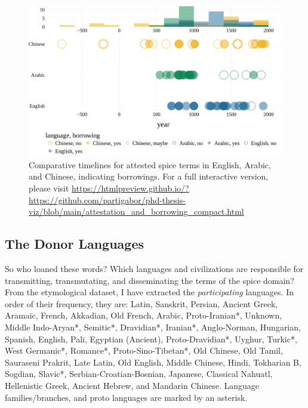 \begin{figure}[!ht]
  \centering
  \includegraphics[width=\linewidth]{imgs/plots/attestation_and_borrowing_compact.pdf}
  \caption[Comparative timelines for attested spice terms, indicating borrowings.]{Comparative timelines for attested spice terms in English, Arabic, and Chinese, indicating borrowings. For a full interactive version, please visit \url{https://htmlpreview.github.io/?https://github.com/partigabor/phd-thesis-viz/blob/main/attestation_and_borrowing_compact.html}}
  \label{fig:attestation_and_borrowing_compact}
\end{figure}

\subsection{The Donor Languages}


So who loaned these words? Which languages and civilizations are responsible for transmitting, transmutating, and disseminating the terms of the spice domain? From the etymological dataset, I have extracted the \textit{participating} languages. In order of their frequency, they are: Latin, Sanskrit, Persian, Ancient Greek, Aramaic, French, Akkadian, Old French, Arabic, Proto-Iranian*, Unknown, Middle Indo-Aryan*, Semitic*, Dravidian*, Iranian*, Anglo-Norman, Hungarian, Spanish, English, Pali, Egyptian (Ancient), Proto-Dravidian*, Uyghur, Turkic*, West Germanic*, Romance*, Proto-Sino-Tibetan*, Old Chinese, Old Tamil, Sauraseni Prakrit, Late Latin, Old English, Middle Chinese, Hindi, Tokharian B, Sogdian, Slavic*, Serbian-Croatian-Bosnian, Japanese, Classical Nahuatl, Hellenistic Greek, Ancient Hebrew, and Mandarin Chinese. Language families/branches, and proto languages are marked by an asterisk.

